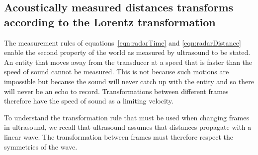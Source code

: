 

\subsection{Acoustically measured distances transforms according to the Lorentz transformation}




The measurement rules of equations~\ref{eqn:radarTime} and \ref{eqn:radarDistance} enable the second property of the world as measured by ultrasound to be stated.
An entity that moves away from the transducer at a speed that is faster than the speed of sound 
cannot be measured.  
This is not because such motions are impossible but because the sound will never catch  up with the entity and so there will never be an echo to record.
Transformations between different frames therefore have the speed of sound as a limiting velocity.


To understand the transformation rule that must be used when changing frames in ultrasound,
we  recall that ultrasound assumes that distances propagate with a linear wave.
The transformation between frames must therefore respect the symmetries of the wave.


